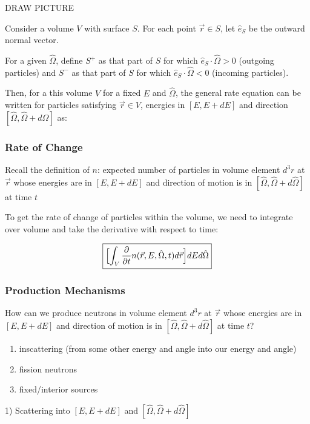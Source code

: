 \documentclass[12pt]{article}
\newcommand{\vOmega}{\ensuremath{\hat{\Omega}}}
\begin{document}
DRAW PICTURE

Consider a volume $V$ with surface $S$. For each point $\vec{r} \in S$, let $\hat{e}_S$ be the outward normal vector.

For a given $\vOmega$, define $S^+$ as that part of $S$ for which $\hat{e}_S \cdot \vOmega > 0$ (outgoing particles) and $S^-$ as that part of $S$ for which $\hat{e}_S \cdot \vOmega < 0$ (incoming particles).

Then, for a this volume $V$ for a fixed $E$ and $\vOmega$, the general rate equation can be written for particles satisfying $\vec{r} \in V$, energies in $[E, E+dE]$ and direction $[\vOmega, \vOmega + d\vOmega]$ as:

\hspace*{3 em} 

\subsubsection{Rate of Change}
Recall the definition of $n$: expected number of particles in volume element $d^3r$ at $\vec{r}$ whose energies are in $[E, E + dE]$ and direction of motion is in $[\vOmega, \vOmega + d\vOmega]$ at time $t$

To get the rate of change of particles within the volume, we need to integrate over volume and take the derivative with respect to time:

\[\boxed{\Bigl[ \int_V \frac{\partial}{\partial t} n(\vec{r}, E, \vOmega, t) d\vec{r} \Bigr] dE d\vOmega }\]


\subsubsection{Production Mechanisms}
How can we produce neutrons in volume element $d^3r$ at $\vec{r}$ whose energies are in $[E, E + dE]$ and direction of motion is in $[\vOmega, \vOmega + d\vOmega]$ at time $t$?
%
\begin{enumerate}
\item inscattering (from some other energy and angle into our energy and angle)
\item fission neutrons 
\item fixed/interior sources
\end{enumerate}

1) Scattering into $[E, E + dE]$ and $[\vOmega, \vOmega + d\vOmega]$
\end{document}
